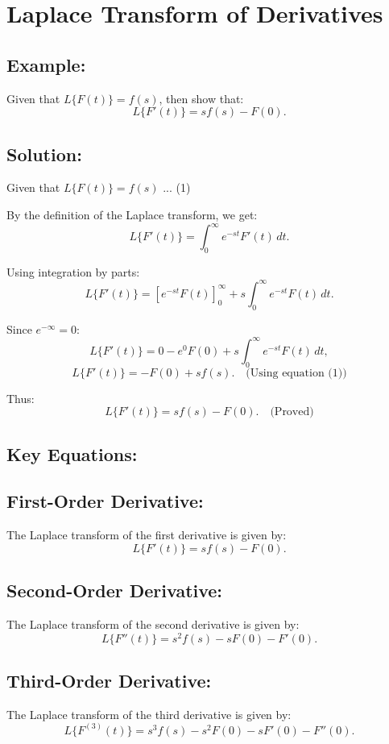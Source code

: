 \documentclass[a4paper,12pt]{article}
\begin{document}
\section*{Laplace Transform of Derivatives}

\subsection*{Example:}
Given that $ L\{F(t)\} = f(s) $, then show that:
\[
L\{F'(t)\} = sf(s) - F(0).
\]

\subsection*{Solution:}
Given that $ L\{F(t)\} = f(s) $ \quad ... (1)

By the definition of the Laplace transform, we get:
\[
L\{F'(t)\} = \int_{0}^{\infty} e^{-st} F'(t) \, dt.
\]

Using integration by parts:
\[
L\{F'(t)\} = \left[ e^{-st} F(t) \right]_{0}^{\infty} + s \int_{0}^{\infty} e^{-st} F(t) \, dt.
\]

Since $ e^{-\infty} = 0 $:
\[
L\{F'(t)\} = 0 - e^{0} F(0) + s \int_{0}^{\infty} e^{-st} F(t) \, dt,
\]
\[
L\{F'(t)\} = -F(0) + s f(s). \quad \text{(Using equation (1))}
\]

Thus:
\[
L\{F'(t)\} = sf(s) - F(0). \quad \text{(Proved)}
\]

\subsection*{Key Equations:}

\subsection*{First-Order Derivative:}
The Laplace transform of the first derivative is given by:
\[
L\{F'(t)\} = s f(s) - F(0).
\]

\subsection*{Second-Order Derivative:}
The Laplace transform of the second derivative is given by:
\[
L\{F''(t)\} = s^2 f(s) - s F(0) - F'(0).
\]

\subsection*{Third-Order Derivative:}
The Laplace transform of the third derivative is given by:
\[
L\{F^{(3)}(t)\} = s^3 f(s) - s^2 F(0) - s F'(0) - F''(0).
\]
\end{document}
